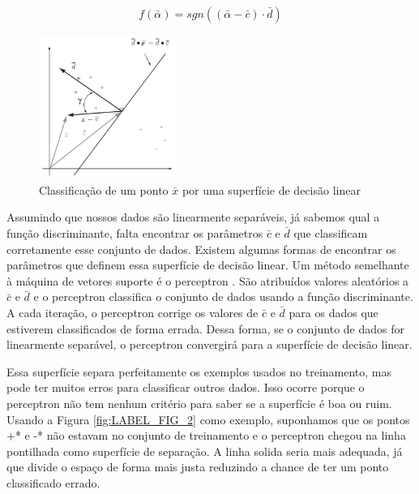 \begin{equation}
f(\bar{\alpha})=sgn((\bar{\alpha}-\bar{c})\cdot\bar{d})
    \label{eq:LABEL_EQ_1}
\end{equation}

\begin{figure}
  \centering
  \includegraphics[width=0.4\textwidth]{imagens/svm_1.png}
  \caption{Classificação de um ponto $\bar{x}$ por uma superfície de decisão linear}
  \label{fig:LABEL_FIG_1}
\end{figure}

Assumindo que nossos dados são linearmente separáveis, já sabemos qual a função discriminante, falta encontrar os parâmetros $\bar{c}$ e $\bar{d}$ que classificam corretamente esse conjunto de dados. Existem algumas formas de encontrar os parâmetros que definem essa superfície de decisão linear. Um método semelhante à máquina de vetores suporte é o perceptron \cite{art:LIVRO_SVM}. São atribuídos valores aleatórios a $\bar{c}$ e $\bar{d}$ e o perceptron classifica o conjunto de dados usando a função discriminante. A cada iteração, o perceptron corrige os valores de $\bar{c}$ e $\bar{d}$ para os dados que estiverem classificados de forma errada. Dessa forma, se o conjunto de dados for linearmente separável, o perceptron convergirá para a superfície de decisão linear.

Essa superfície separa perfeitamente os exemplos usados no treinamento, mas pode ter muitos erros para classificar outros dados. Isso ocorre porque o perceptron não tem nenhum critério para saber se a superfície é boa ou ruim. Usando a Figura \ref{fig:LABEL_FIG_2} como exemplo, suponhamos que os pontos +* e -* não estavam no conjunto de treinamento e o perceptron chegou na linha pontilhada como superfície de separação. A linha solida seria mais adequada, já que divide o espaço de forma mais justa reduzindo a chance de ter um ponto classificado errado.

